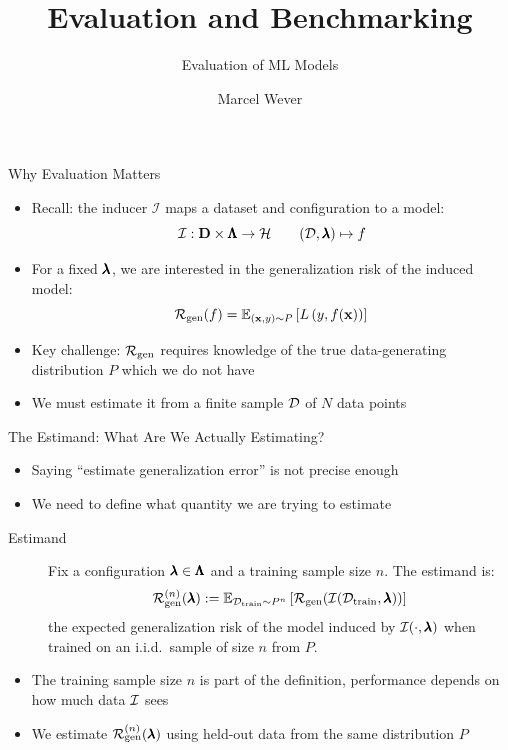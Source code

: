 \documentclass[main]{subfiles}
\title[Evaluation and Benchmarking]{Evaluation and Benchmarking}
\subtitle{Evaluation of ML Models}
\author[Marcel Wever]{Marcel Wever}
\date{}
\begin{document}
	
	\maketitle
	
\begin{frame}[c]{Why Evaluation Matters}

\begin{itemize}
    \item Recall: the inducer $\mathcal{I}$ maps a dataset and configuration to a model:
    $$\mathcal{I}: \mathbf{D} \times \pmb{\Lambda} \to \mathcal{H} \qquad (\mathcal{D}, \pmb{\lambda})\mapsto f$$
    \item For a fixed $\pmb{\lambda}$, we are interested in the generalization risk of the induced model:
    $$\mathcal{R}_{\text{gen}}(f) = \mathbb{E}_{(\mathbf{x}, y) \sim P} \left[ L \left(y, f(\mathbf{x}) \right) \right]$$
    \item Key challenge: $\mathcal{R}_{\text{gen}}$ requires knowledge of the true data-generating distribution $P$ which we do not have
    \item We must estimate it from a finite sample $\mathcal{D}$ of $N$ data points
\end{itemize}

\end{frame}

\begin{frame}{The Estimand: What Are We Actually Estimating?}
    \begin{itemize}
        \item Saying ``estimate generalization error'' is not precise enough
        \item We need to define what quantity we are trying to estimate
    \end{itemize}
    \begin{description}
        \item[Estimand] Fix a configuration $\pmb{\lambda} \in \pmb{\Lambda}$ and a training sample size $n$. The estimand is:
        $$\mathcal{R}_{\text{gen}}^{(n)}(\pmb{\lambda}) := \mathbb{E}_{\mathcal{D}_{\text{train}} \sim P^n}\left[\mathcal{R}_{\text{gen}}\!\left(\mathcal{I}(\mathcal{D}_{\text{train}}, \pmb{\lambda})\right)\right]$$
        the expected generalization risk of the model induced by $\mathcal{I}(\cdot, \pmb{\lambda})$ when trained on an i.i.d.\ sample of size $n$ from $P$.
    \end{description}
    \begin{itemize}
        \item The training sample size $n$ is part of the definition, performance depends on how much data $\mathcal{I}$ sees
        \item We estimate $\mathcal{R}_{\text{gen}}^{(n)}(\pmb{\lambda})$ using held-out data from the same distribution $P$
    \end{itemize}
\end{frame}
\end{document}

